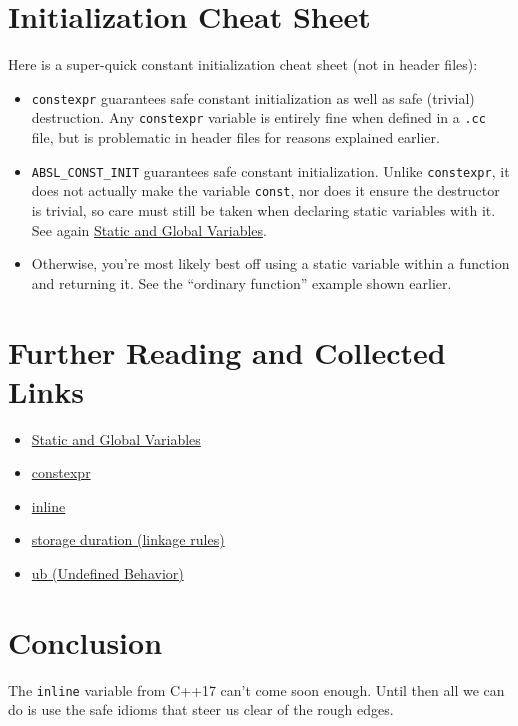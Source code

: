\section{Initialization Cheat Sheet}\label{sec:initialization-cheat-sheet}
Here is a super-quick constant initialization cheat sheet (not in header files):
\begin{itemize}
    \item \texttt{constexpr} guarantees safe constant initialization as well as safe (trivial) destruction. Any \texttt{constexpr} variable is entirely fine when defined in a \texttt{.cc} file, but is problematic in header files for reasons explained earlier.
    \item \texttt{ABSL_CONST_INIT} guarantees safe constant initialization. Unlike \texttt{constexpr}, it does not actually make the variable \texttt{const}, nor does it ensure the destructor is trivial, so care must still be taken when declaring static variables with it. See again \hyperref[sec:static-and-global-variables]{Static and Global Variables}.
    \item Otherwise, you’re most likely best off using a static variable within a function and returning it. See the \enquote{ordinary function} example shown earlier.
\end{itemize}

\section{Further Reading and Collected Links}\label{sec:further-reading-and-collected-links}
\begin{itemize}
    \item \hyperref[sec:static-and-global-variables]{Static and Global Variables}
    \item \href{http://en.cppreference.com/w/cpp/language/constexpr}{constexpr}
    \item \href{http://en.cppreference.com/w/cpp/language/inline}{inline}
    \item \href{http://en.cppreference.com/w/cpp/language/storage_duration (linkage rules)}{storage duration (linkage rules)}
    \item \href{http://en.cppreference.com/w/cpp/language/}{ub (Undefined Behavior)}
\end{itemize}

\section{Conclusion}\label{sec:conclusion}
The \texttt{inline} variable from C++17 can’t come soon enough. Until then all we can do is use the safe idioms that steer us clear of the rough edges.

